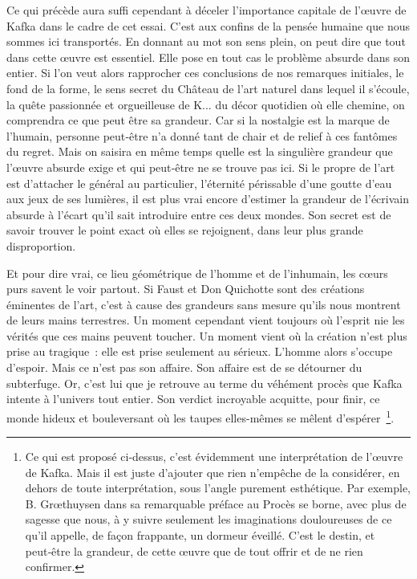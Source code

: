 \documentclass{book}
\begin{document}
Ce qui précède aura suffi cependant à déceler l'importance capitale de l'œuvre de Kafka dans le cadre de cet essai. C'est aux confins de la pensée humaine que nous sommes ici transportés. En donnant au mot son sens plein, on peut dire que tout dans cette œuvre est essentiel. Elle pose en tout cas le problème absurde dans son entier. Si l'on veut alors rapprocher ces conclusions de nos remarques initiales, le fond de la forme, le sens secret du Château de l'art naturel dans lequel il s'écoule, la quête passionnée et orgueilleuse de K... du décor quotidien où elle chemine, on comprendra ce que peut être sa grandeur. Car si la nostalgie est la marque de l'humain, personne peut‑être n'a donné tant de chair et de relief à ces fantômes du regret. Mais on saisira en même temps quelle est la singulière grandeur que l'œuvre absurde exige et qui peut‑être ne se trouve pas ici. Si le propre de l'art est d'attacher le général au particulier, l'éternité périssable d'une goutte d'eau aux jeux de ses lumières, il est plus vrai encore d'estimer la grandeur de l'écrivain absurde à l'écart qu'il sait introduire entre ces deux mondes. Son secret est de savoir trouver le point exact où elles se rejoignent, dans leur plus grande disproportion.

Et pour dire vrai, ce lieu géométrique de l'homme et de l'inhumain, les cœurs purs savent le voir partout. Si Faust et Don Quichotte sont des créations éminentes de l'art, c'est à cause des grandeurs sans mesure qu'ils nous montrent de leurs mains terrestres. Un moment cependant vient toujours où l'esprit nie les vérités que ces mains peuvent toucher. Un moment vient où la création n'est plus prise au tragique : elle est prise seulement au sérieux. L'homme alors s'occupe d'espoir. Mais ce n'est pas son affaire. Son affaire est de se détourner du subterfuge. Or, c'est lui que je retrouve au terme du véhément procès que Kafka intente à l'univers tout entier. Son verdict incroyable acquitte, pour finir, ce monde hideux et bouleversant où les taupes elles-mêmes se mêlent d'espérer \footnote{Ce qui est proposé ci‑dessus, c'est évidemment une interprétation de l'œuvre de Kafka. Mais il est juste d'ajouter que rien n'empêche de la considérer, en dehors de toute interprétation, sous l'angle purement esthétique. Par exemple, B. Grœthuysen dans sa remarquable préface au Procès se borne, avec plus de sagesse que nous, à y suivre seulement les imaginations douloureuses de ce qu'il appelle, de façon frappante, un dormeur éveillé. C'est le destin, et peut‑être la grandeur, de cette œuvre que de tout offrir et de ne rien confirmer.}.
\end{document}
